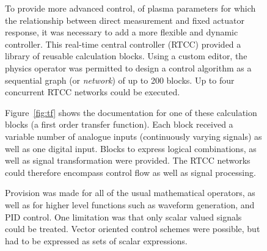 \documentclass[preprint]{elsarticle}
\begin{document}
\begin{figure}[!p]
To provide more advanced control, of plasma parameters for which the
relationship between direct measurement and fixed actuator response, 
it was necessary to add a more flexible and dynamic controller.
This real-time central controller (RTCC) provided a library of
reusable calculation blocks.  Using a custom editor, the physics
operator was permitted to design a control algorithm as a 
sequential graph (or {\em network}) of up to 200 blocks.
Up to four concurrent RTCC networks could be executed.

Figure~\ref{fig:tf} shows the documentation for one of these calculation
blocks (a first order transfer function). Each block received a variable
number of analogue inputs (continuously varying signals) as well as
one digital input. Blocks to express logical combinations, as well as
signal transformation were provided.  
The RTCC networks could therefore encompass 
control flow as well as signal processing.

Provision was made for all of the
usual mathematical operators, as well as for higher level functions such
as waveform generation, and PID control.  One limitation was that
only scalar valued signals could be treated.  Vector oriented control
schemes were possible, but had to be expressed as sets of scalar 
expressions.


\end{figure}
\end{document}
